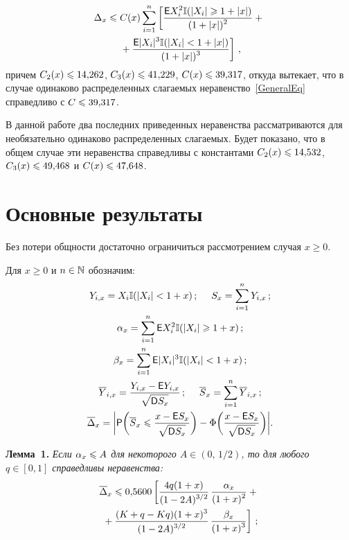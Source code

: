 \begin{multicols}{2}
\vspace*{-12pt}

\noindent
\begin{multline*}
\Delta_x\leqslant C(x)\sum\limits_{i=1}^n\left[\displaystyle\frac{\displaystyle {\sf E} X_i^2\mathbb{I}(|X_i|\geqslant
1+|x|)\mathstrut}{\displaystyle (1+|x|)^2\mathstrut}+{}\right.\\
\left.{}+\displaystyle\frac{\displaystyle {\sf E} |X_i|^3\mathbb{I}(|X_i|<
1+|x|)\mathstrut}{\displaystyle (1+|x|)^3\mathstrut}\right]\,,
\end{multline*}
причем $C_2(x)\hm\leqslant 14{,}262$, $C_3(x)\hm\leqslant 41{,}229$, $C(x)\hm\leqslant 39{,}317$,
откуда вытекает, что в случае одинаково распределенных слагаемых
неравенство~\eqref{GeneralEq} справедливо с $C\hm\leqslant 39{,}317$.

В данной работе два последних приведенных нера\-вен\-ст\-ва рассматриваются
для необязательно одинаково распределенных слагаемых. Будет показано,
что в общем случае эти неравенства справедливы с константами
$C_2(x) \hm\leqslant 14{,}532$, $C_3(x)\hm\leqslant 49{,}468$
и $C(x)\hm\leqslant 47{,}648$.

\section{Основные результаты}

Без потери общности достаточно ограничиться
рассмотрением случая $x\geqslant 0$.

Для $x\geqslant 0$ и $n\in\mathbb N$ обозначим:
\begin{gather*}
Y_{i,x}=X_i \Iy (|X_i|<1+x)\,;\ \ \ \ S_x=\sum\limits_{i=1}^nY_{i,x}\,;
\\
\alpha_x=\sum\limits_{i=1}^n\e X_i^2\Iy (|X_i|\geqslant 1+x)\,;
\\
\beta_x=\sum\limits_{i=1}^n\e |X_i|^3\Iy (|X_i|<1+x)\,;
\\
\overline{Y}_{i,x}=\fr{Y_{i,x}-\e Y_{i,x}}{\sqrt{\D S_x}}\,;\ \ \
\ \overline{S}_x=\sum\limits_{i=1}^n\overline{Y}_{i,x}\,;
\\
\overline{\Delta}_x=\bigg |\p\bigg(\overline{S}_x\leqslant\fr{x-\e
S_x}{\sqrt{\D S_x}}\bigg)-\Phi\bigg(\fr{x-\e
S_x}{\sqrt{\D S_x}}\bigg)\bigg|.
\end{gather*}

\smallskip

\noindent
\textbf{Лемма~1.} %
\textit{Если $\alpha_x\hm\leqslant A$ для некоторого $A\in(0,\,1/2)$, то
для любого $q\in [0,1]$ справедливы неравенства:}
\begin{multline} 
\label{delta_overline_lemma_tmp_1}
\overline{\Delta}_x\leqslant 0{,}5600\left[
 \displaystyle\frac{\displaystyle 4 q(1+x)\mathstrut}{\displaystyle (1-2A)^{3/2}\mathstrut}\, 
 \displaystyle\frac{\displaystyle \alpha_x\mathstrut}{\displaystyle (1+x)^2\mathstrut}+{}\right.\\
\left. {}+\displaystyle\frac{\displaystyle (K+q-Kq)(1+x)^3\mathstrut}{\displaystyle (1-2A)^{3/2}\mathstrut}\,
 \displaystyle\frac{\displaystyle \beta_x\mathstrut}{\displaystyle (1+x)^3\mathstrut}\right]\,;
\end{multline}


\end{multicols}
